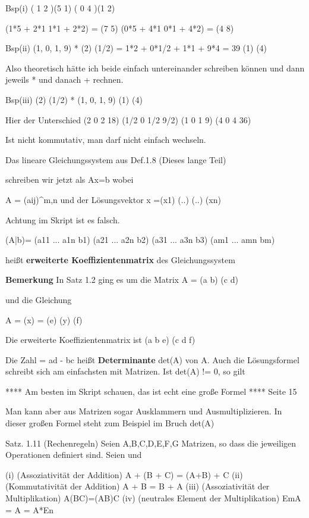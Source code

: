Bsp(i) 	( 1 2 )(5 1)
		( 0 4 )(1 2)
		
		(1*5 + 2*1 1*1 + 2*2)   = (7 5)
		(0*5 + 4*1 0*1 + 4*2)   = (4 8)
		
Bsp(ii)	(1, 0, 1, 9) *  (2)
						(1/2)  = 1*2 + 0*1/2 + 1*1 + 9*4 = 39
						(1)
						(4)
						
						
Also theoretisch hätte ich beide einfach untereinander schreiben können und dann jeweils * und danach + rechnen.

Bsp(iii)	(2)
			(1/2) * (1, 0, 1, 9)  
			(1)
			(4)
			
Hier der Unterschied
			(2		0	2	18)
			(1/2	0	1/2	9/2)
			(1		0	1	9)
			(4		0	4	36)
			
Ist nicht kommutativ, man darf nicht einfach wechseln.

Das lineare Gleichungssystem aus Def.1.8
(Dieses lange Teil)

schreiben wir jetzt als 
Ax=b wobei

A = (aij)^m,n 
und der Lösungsvektor x =(x1)
						 (..)
						 (..)
						 (xn)
						
Achtung im Skript ist es falsch.

(A|b)= (a11 ... a1n b1)
	   (a21 ... a2n b2)
	   (a31 ... a3n b3)
	   (am1 ... amn bm)

heißt \textbf{erweiterte Koeffizientenmatrix} des Gleichungssystem

\textbf{Bemerkung} In Satz 1.2 ging es um die Matrix A = (a b)
 														 (c d)
														
und die Gleichung 

	A = (x) = (e)
		(y)   (f)
		
Die erweiterte Koeffizientenmatrix ist (a b e)
									   (c d f)
									

Die Zahl \delta = ad - bc heißt \textbf{Determinante} det(A) von A.
Auch die Lösungsformel schreibt sich am einfachsten mit Matrizen. Ist det(A) != 0, so gilt

**** Am besten im Skript schauen, das ist echt eine große Formel **** Seite 15

Man kann aber aus Matrizen sogar Ausklammern und Ausmultiplizieren.
In dieser großen Formel steht zum Beispiel im Bruch det(A)

Satz. 1.11 (Rechenregeln) Seien
A,B,C,D,E,F,G Matrizen, so dass die jeweiligen Operationen definiert sind.
Seien \alpha und \beta

(i) (Assoziativität der Addition)
A + (B + C) = (A+B) + C
(ii) (Kommutativität der Addition)
A + B = B + A
(iii) (Assoziativität der Multiplikation)
	A(BC)=(AB)C
(iv) (neutrales Element der Multiplikation)
	EmA = A = A*En
	
